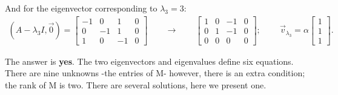 And for the eigenvector corresponding to $\lambda_3=3$:
\begin{eqnarray*}
  (A-\lambda_3 I,\vec{0})=\left[\begin{array}{ccc|c}-1&0&1&0\\0&-1&1&0\\1&0&-1&0\end{array}\right]
	\qquad\rightarrow\qquad
	\left[\begin{array}{ccc|c}1&0&-1&0\\0&1&-1&0\\0&0&0&0\end{array}\right];\qquad\
	\vec{v}_{\lambda_3}=\alpha\left[\begin{array}{c}1\\1\\1\end{array}\right].
\end{eqnarray*}

\vspace{2mm}
The answer is \textbf{yes}. The two eigenvectors and eigenvalues define six equations. There are nine unknowns -the entries of M- however, there is an extra condition; the rank of M is two. There are several solutions, here we present one.

